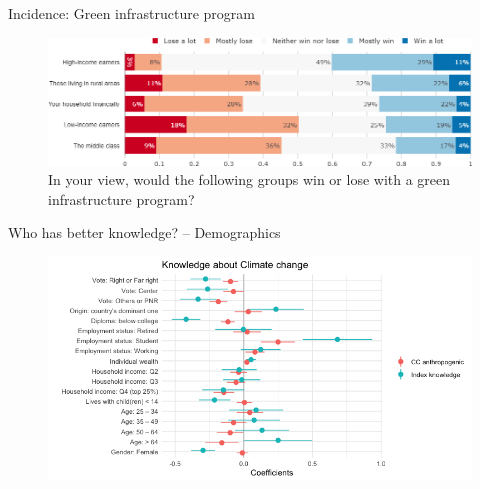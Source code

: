 \begin{framefont}{\small}
\begin{frame}{Incidence: Green infrastructure program}%
	\begin{figure}[h!]
	\centering
	\caption{In your view, would the following groups win or lose with a green infrastructure program?}
	\includegraphics[width=.87\paperwidth]{../figures/FR/investments_win_lose_FR.png}
	\end{figure}
\end{frame}
	

\begin{frame}{Who has better knowledge? -- Demographics}

\begin{figure}
	\includegraphics[width=.9\paperwidth]{../figures/FR/reg_anthropogenic_knowledge_A_FR.png}
\end{figure}
\end{frame}


\end{framefont}

